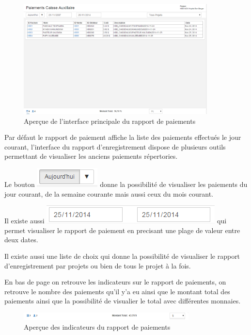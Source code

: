 \documentclass[12pt,a4paper]{report}
\begin{document}
\begin{figure}[h]
\begin{center}
\includegraphics[width=10cm]{pic/rapportCaisseAux.png}
\end{center}
\caption{Aperçue de l'interface principale du rapport de paiements}
\label{Aperçue de l'interface principale du rapport de paiements}
\end{figure}

Par défaut le rapport de paiement affiche la liste des paiements effectués le jour courant, l'interface du rapport d'enregistrement dispose de plusieurs outils permettant de visualiser les anciens paiements répertories.

Le bouton \includegraphics[scale=0.7]{pic/Todays.png} donne la possibilité de visualiser les paiements du jour courant, de la semaine courante mais aussi ceux du mois courant. 

Il existe aussi  \includegraphics[scale=0.7]{pic/PlageTimes.png} qui permet visualiser le rapport de paiement en precisant une plage de valeur entre deux dates.

Il existe aussi une liste de choix qui donne la possibilité de visualiser le rapport d'enregistrement par projets ou bien de tous le projet à la fois.

En bas de page on retrouve les indicateurs sur le rapport de paiements, on retrouve le nombre des paiements qu'il y'a eu ainsi que le montant total des paiements ainsi que la possibilité de visualier le total avec différentes monnaies. 

\begin{figure}[h]
\begin{center}
\includegraphics[width=9cm]{pic/IndRapPaiement.png}
\end{center}
\caption{Aperçue des indicateurs du rapport de paiements}
\label{Aperçue des indicateurs du rapport de paiements}
\end{figure}
\end{document}
